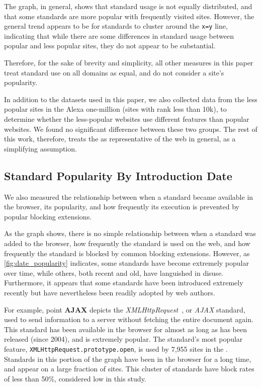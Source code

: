 The graph, in general, shows that standard usage is not equally distributed,
and that some standards are more popular with frequently visited sites.
However, the general trend appears to be for standards to cluster around the
\texttt{x=y} line, indicating that while there are some differences in standard
usage between popular and less popular sites, they do not appear to be
substantial.

Therefore, for the sake of brevity and simplicity, all other measures in this
paper treat standard use on all domains as equal, and do not consider a site's
popularity.

In addition to the datasets used in this paper, we also collected data
from the less popular sites in the Alexa one-million (sites with rank less
than 10k), to determine whether the less-popular websites use different
features than popular websites.  We found no significant difference
between these two groups.  The rest of this work, therefore, treats the \ATK as
representative of the web in general, as a simplifying assumption.


\subsection{Standard Popularity By Introduction Date}

We also measured the relationship between when a standard became available in
the browser, its popularity, and how frequently its execution is prevented by
popular blocking extensions.

As the graph shows, there is no simple relationship between when a standard was
added to the browser, how frequently the standard is used on the web, and how
frequently the standard is blocked by common blocking extensions.  However, as
\ref{fig:date_popularity} indicates, some standards have become extremely
popular over time, while others, both recent and old, have languished in
disuse. Furthermore, it appears that some standards have been introduced
extremely recently but have nevertheless been readily adopted by web authors.

For example, point \textbf{AJAX} depicts the
\textit{XMLHttpRequest}~\cite{ajaxwhatwg}, or \textit{AJAX} standard, used to
send information to a server without fetching the entire document again.  This
standard has been available in the browser for almost as long as \FF has been
released (since 2004), and is extremely popular. The standard's most popular
feature, \texttt{XMLHttpRequest.prototype.open}, is used by 7,955 sites in the
\ATK.  Standards in this portion of the graph have been in the browser for
a long time, and appear on a large fraction of sites.  This cluster of
standards have block rates of less than 50\%, considered low in this study.

